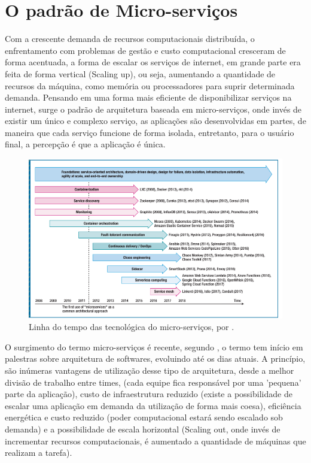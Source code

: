 
\chapter{\textbf{O padrão de Micro-serviços}} %

Com a crescente demanda de recursos computacionais distribuída, o enfrentamento com problemas de gestão e custo computacional  cresceram de forma acentuada, a forma de escalar os serviços de internet, em grande parte era feita de forma vertical (Scaling up), ou seja, aumentando a quantidade de recursos da máquina, como memória ou processadores para suprir determinada demanda. Pensando em uma forma mais eficiente de disponibilizar serviços na internet, surge o padrão de arquitetura baseada em micro-serviços, onde invés de existir um único e complexo serviço, as aplicações são desenvolvidas em partes, de maneira que cada serviço funcione de forma isolada, entretanto, para o usuário final, a percepção é que a aplicação é única. 

\begin{figure}[h!]
	\includegraphics[width=\linewidth]{topics/timeline.png}
	\caption{Linha do tempo das tecnológica do micro-serviços, por \cite{8354433}.}
	\label{fig:timelinemicroservices}
\end{figure}


O surgimento do termo micro-serviços é recente, segundo \cite{8354433}, o termo tem início em palestras sobre arquitetura de softwares, evoluindo até os dias atuais. A princípio, são inúmeras vantagens de utilização desse tipo de arquitetura, desde a melhor divisão de trabalho entre times, (cada equipe fica responsável por uma 'pequena' parte da aplicação), custo de infraestrutura reduzido (existe a possibilidade de escalar uma aplicação em demanda da utilização de forma mais coesa), eficiência energética e custo reduzido (poder computacional estará sendo escalado sob  demanda) e a possibilidade de escala horizontal (Scaling out, onde invés de incrementar recursos computacionais, é aumentado a quantidade de máquinas que realizam a tarefa).
